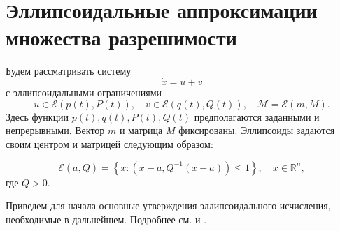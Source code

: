 \section{Эллипсоидальные аппроксимации множества разрешимости}
Будем рассматривать систему
\begin{equation*}
    \dot{x} = u + v
\end{equation*}
с эллипсоидальными ограничениями
\begin{equation*}
    u \in \mathcal{E}(p(t), P(t)), \quad v \in \mathcal{E}(q(t), Q(t)), \quad \mathcal{M} = 
     \mathcal{E}(m, M).
\end{equation*}
Здесь функции \( p(t), q(t), P(t), Q(t) \) предполагаются заданными и непрерывными. Вектор \( m \) и
 матрица \( M \) фиксированы. Эллипсоиды задаются своим центром и матрицей следующим образом:
 
\begin{equation}
    \mathcal{E}(a, Q) = \left\{ x : (x - a, Q^{-1}(x - a)) \le 1 \right\}, \quad x \in \mathbb{R}^n,
\end{equation}
где \( Q > 0 \).

Приведем для начала основные утверждения эллипсоидального исчисления, необходимые в дальнейшем. Подробнее 
см. \cite{ellips_calculus} и \cite{reach_an_unc_sys}.


